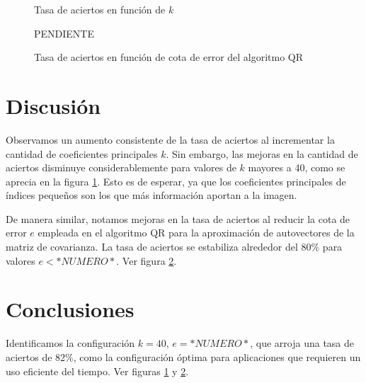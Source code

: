 \documentclass[a4paper,10pt,twoside]{article}
\begin{document}
\begin{figure}[H]
  \centering
  
  \caption{Tasa de aciertos en función de $k$}
  \label{tasas-vs-k}
\end{figure}


\begin{figure}[H]
  \centering
  PENDIENTE
  \caption{Tasa de aciertos en función de cota de error del algoritmo QR}
  \label{tasas-vs-cota}
\end{figure}





\section{Discusión}

Observamos un aumento consistente de la tasa de aciertos al incrementar la cantidad de coeficientes principales $k$. Sin embargo, las mejoras en la cantidad de aciertos disminuye considerablemente para valores de $k$ mayores a 40, como se aprecia en la figura \ref{tasas-vs-k}. Esto es de esperar, ya que los coeficientes principales de índices pequeños son los que más información aportan a la imagen.

De manera similar, notamos mejoras en la tasa de aciertos al reducir la cota de error $e$ empleada en el algoritmo QR para la aproximación de autovectores de la matriz de covarianza. La tasa de aciertos se estabiliza alrededor del 80\% para valores $e < *NUMERO*$. Ver figura \ref{tasas-vs-cota}.




\section{Conclusiones}

Identificamos la configuración $k = 40$, $e = *NUMERO*$, que arroja una tasa de aciertos de 82\%, como la configuración óptima para aplicaciones que requieren un uso eficiente del tiempo. Ver figuras \ref{tasas-vs-k} y \ref{tasas-vs-cota}.
\end{document}
